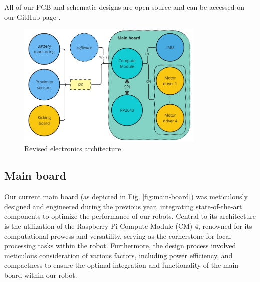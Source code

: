 \documentclass[runningheads]{llncs}
\begin{document}
All of our PCB and schematic designs are open-source and can be accessed on our GitHub page \cite{ref_github}.

\begin{figure}
	\centering
	\includegraphics[width=0.8\textwidth]{images/electronics-architecture.jpg}
	\caption{Revised electronics architecture}
	\label{fig:electronics-architecture}
\end{figure}

\subsection{Main board}

Our current main board \cite{ref_mainboard} (as depicted in Fig. \ref{fig:main-board}) was meticulously designed and engineered during the previous year, integrating state-of-the-art components to optimize the performance of our robots. Central to its architecture is the utilization of the Raspberry Pi Compute Module (CM) 4, renowned for its computational prowess and versatility, serving as the cornerstone for local processing tasks within the robot. Furthermore, the design process involved meticulous consideration of various factors, including power efficiency, and compactness to ensure the optimal integration and functionality of the main board within our robot.
\end{document}
